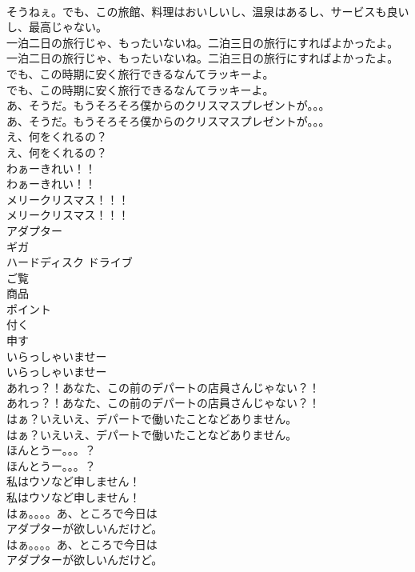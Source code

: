 \documentclass[8pt]{extreport}
\begin{document}
\begin{CJK}{UTF8}{min}
\\	そうねぇ。でも、この旅館、料理はおいしいし、温泉はあるし、サービスも良いし、最高じゃない。 
\\	一泊二日の旅行じゃ、もったいないね。二泊三日の旅行にすればよかったよ。	
\\	一泊二日の旅行じゃ、もったいないね。二泊三日の旅行にすればよかったよ。 
\\	でも、この時期に安く旅行できるなんてラッキーよ。	
\\	でも、この時期に安く旅行できるなんてラッキーよ。 
\\	あ、そうだ。もうそろそろ僕からのクリスマスプレゼントが。。。	
\\	あ、そうだ。もうそろそろ僕からのクリスマスプレゼントが。。。 
\\	え、何をくれるの？	
\\	え、何をくれるの？ 
\\	わぁーきれい！！	
\\	わぁーきれい！！ 
\\	メリークリスマス！！！	
\\	メリークリスマス！！！ 
\\	アダプター
\\	ギガ
\\	ハードディスク ドライブ
\\	ご覧
\\	商品
\\	ポイント
\\	付く
\\	申す
\\	いらっしゃいませー	
\\	いらっしゃいませー 
\\	あれっ？！あなた、この前のデパートの店員さんじゃない？！	
\\	あれっ？！あなた、この前のデパートの店員さんじゃない？！ 
\\	はぁ？いえいえ、デパートで働いたことなどありません。	
\\	はぁ？いえいえ、デパートで働いたことなどありません。 
\\	ほんとうー。。。？	
\\	ほんとうー。。。？ 
\\	私はウソなど申しません！	
\\	私はウソなど申しません！ 
\\	はぁ。。。。あ、ところで今日は
\\	アダプターが欲しいんだけど。	
\\	はぁ。。。。あ、ところで今日は
\\	アダプターが欲しいんだけど。 

\end{CJK}
\end{document}
